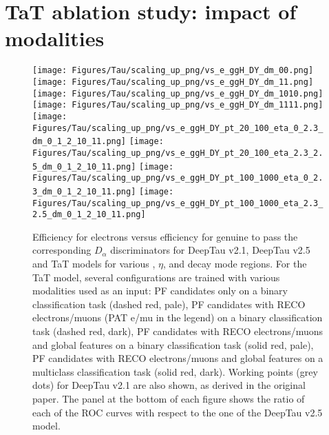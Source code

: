 \section{TaT ablation study: impact of modalities}\label{app:tat-add}

\begin{figure}[H]
    \centering
    \texttt{[image: Figures/Tau/scaling\_up\_png/vs\_e\_ggH\_DY\_dm\_00.png]}
    \texttt{[image: Figures/Tau/scaling\_up\_png/vs\_e\_ggH\_DY\_dm\_11.png]}
    \texttt{[image: Figures/Tau/scaling\_up\_png/vs\_e\_ggH\_DY\_dm\_1010.png]}
    \texttt{[image: Figures/Tau/scaling\_up\_png/vs\_e\_ggH\_DY\_dm\_1111.png]}
    \texttt{[image: Figures/Tau/scaling\_up\_png/vs\_e\_ggH\_DY\_pt\_20\_100\_eta\_0\_2.3\_dm\_0\_1\_2\_10\_11.png]}
    \texttt{[image: Figures/Tau/scaling\_up\_png/vs\_e\_ggH\_DY\_pt\_20\_100\_eta\_2.3\_2.5\_dm\_0\_1\_2\_10\_11.png]}
    \texttt{[image: Figures/Tau/scaling\_up\_png/vs\_e\_ggH\_DY\_pt\_100\_1000\_eta\_0\_2.3\_dm\_0\_1\_2\_10\_11.png]}
    \texttt{[image: Figures/Tau/scaling\_up\_png/vs\_e\_ggH\_DY\_pt\_100\_1000\_eta\_2.3\_2.5\_dm\_0\_1\_2\_10\_11.png]}
    \caption{Efficiency for electrons versus efficiency for genuine \tauh to pass the corresponding $D_\alpha$ discriminators for DeepTau v2.1, DeepTau v2.5 and TaT models for various \pt, $\eta$, and \tauh decay mode regions. For the TaT model, several configurations are trained with various modalities used as an input: PF candidates only on a binary classification task (dashed red, pale), PF candidates with RECO electrons/muons (PAT e/mu in the legend) on a binary classification task (dashed red, dark), PF candidates with RECO electrons/muons and global features on a binary classification task (solid red, pale), PF candidates with RECO electrons/muons and global features on a multiclass classification task (solid red, dark). Working points (grey dots) for DeepTau v2.1 are also shown, as derived in the original paper. The panel at the bottom of each figure shows the ratio of each of the ROC curves with respect to the one of the DeepTau v2.5 model.}
\end{figure}

